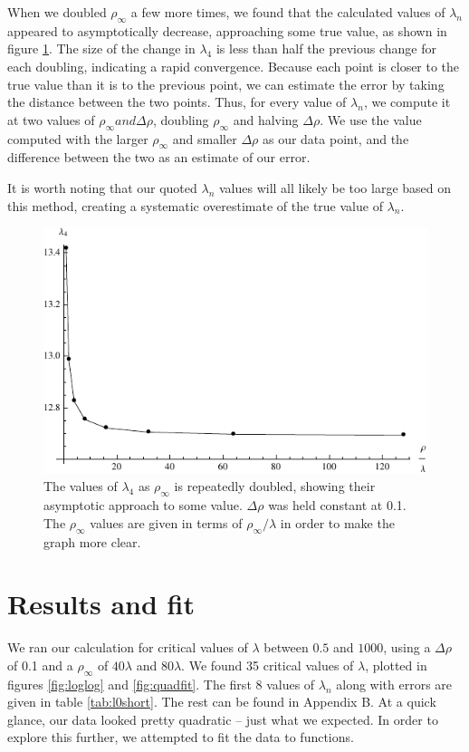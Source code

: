 \documentclass[12pt,twoside]{reedthesis}
\begin{document}
When we doubled $\rho_{\infty}$ a few more times, we found that the calculated values of $\lambda_{n}$ appeared to asymptotically decrease, approaching some true value, as shown in figure \ref{fig:asymtote}. The size of the change in $\lambda_4$ is less than half the previous change for each doubling, indicating a rapid convergence. Because each point is closer to the true value than it is to the previous point, we can estimate the error by taking the distance between the two points. Thus, for every value of $\lambda_n$, we compute it at two values of $\rho_{\infty} and \Delta \rho$, doubling $\rho_{\infty}$ and halving $\Delta \rho$. We use the value computed with the larger $\rho_{\infty}$ and smaller $\Delta \rho$ as our data point, and the difference between the two as an estimate of our error.

It is worth noting that our quoted $\lambda_n$ values will all likely be too large based on this method, creating a systematic overestimate of the true value of $\lambda_n$.
 
\begin{figure}[h]
\centering
\includegraphics{Figures/asymtote}
\caption[Asymtotic behavior of $\lambda_{4} (\rho_{\infty})$]{The values of $\lambda_{4}$ as $\rho_{\infty}$ is repeatedly doubled, showing their asymptotic approach to some value. $\Delta \rho$ was held constant at 0.1. The $\rho_{\infty}$ values are given in terms of $\rho_{\infty}/\lambda$ in order to make the graph more clear.}
\label{fig:asymtote}
\end{figure} 

\section{Results and fit}
We ran our calculation for critical values of $\lambda$ between $0.5$ and $1000$, using a $\Delta \rho$ of 0.1 and a $\rho_{\infty}$ of $40 \lambda$ and $80 \lambda$. We found 35 critical values of $\lambda$, plotted in figures \ref{fig:loglog} and \ref{fig:quadfit}. The first 8 values of $\lambda_n$ along with errors are given in table \ref{tab:l0short}. The rest can be found in Appendix B. At a quick glance, our data looked pretty quadratic -- just what we expected. In order to explore this further, we attempted to fit the data to functions.
\end{document}
